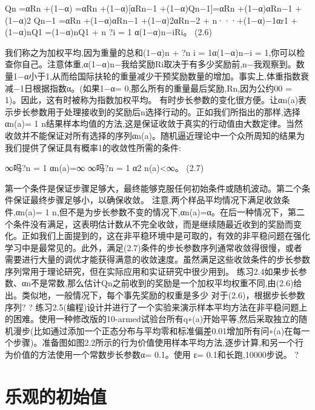 Qn =αRn +(1−α)
=αRn +(1−α)[αRn−1 +(1−α)Qn−1]=αRn +(1−α)αRn−1 +(1−α)2 Qn−1
=αRn +(1−α)αRn−1 +(1−α)2αRn−2 +
n···+(1−α)−1αr1 +(1−α)nQ1
=(1−α)nQ1 +
n ?i = 1
α(1−α)n−iRi。 					(2.6)

我们称之为加权平均,因为重量的总和(1−α)n + ?n i = 1α(1−α)n−i = 1,你可以检查你自己。注意体重,α(1−α)n−我给奖励Ri取决于有多少奖励前,n−我观察到。数量1−α小于1,从而给国际扶轮的重量减少干预奖励数量的增加。事实上,体重指数衰减−1日根据指数α。(如果1−α= 0,那么所有的重量最后奖励,Rn,因为公约00 = 1)。因此，这有时被称为指数加权平均。
有时步长参数的变化很方便。让αn(a)表示步长参数用于处理接收到的奖励后n选择行动的。正如我们所指出的那样,选择αn(a)= 1 n结果样本均值的方法,这是保证收敛于真实的行动值由大数定律。当然收敛并不能保证对所有选择的序列{αn(a)}。随机逼近理论中一个众所周知的结果为我们提供了保证具有概率1的收敛性所需的条件:

∞吗?n = 1
αn(a)=∞
∞吗?n = 1
α2 n(a)<∞。 					(2.7)

第一个条件是保证步骤足够大，最终能够克服任何初始条件或随机波动。第二个条件保证最终步骤足够小，以确保收敛。
注意,两个样品平均情况下满足收敛条件,αn(a)= 1 n,但不是为步长参数不变的情况下,αn(a)=α。在后一种情况下，第二个条件没有满足，这表明估计数从不完全收敛，而是继续随最近收到的奖励而变化。正如我们上面提到的，这在非平稳环境中是可取的，有效的非平稳问题在强化学习中是最常见的。此外，满足(2.7)条件的步长参数序列通常收敛得很慢，或者需要进行大量的调优才能获得满意的收敛速度。虽然满足这些收敛条件的步长参数序列常用于理论研究，但在实际应用和实证研究中很少用到。
练习2.4如果步长参数、αn不是常数,那么估计Qn之前收到的奖励是一个加权平均权重不同,由(2.6)给出。类似地，一般情况下，每个事先奖励的权重是多少
对于(2.6)，根据步长参数序列? 					?
练习2.5(编程)设计并进行了一个实验来演示样本平均方法在非平稳问题上的困难。使用一种修改版的10-armed试验台所有q∗(a)开始平等,然后采取独立的随机漫步(比如通过添加一个正态分布与平均零和标准偏差0.01增加所有问∗(a)在每一个步骤)。准备图如图2.2所示的行为价值使用样本平均方法,逐步计算,和另一个行为价值的方法使用一个常数步长参数α= 0.1。使用
ε= 0.1和长跑,10000步说。 					?
\section{乐观的初始值}


